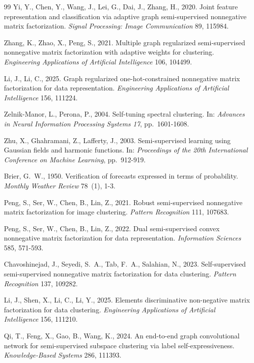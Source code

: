 \documentclass[11pt]{article}
\theoremstyle{remark}
\begin{document}
\begin{thebibliography}{99}
Yi, Y., Chen, Y., Wang, J., Lei, G., Dai, J., Zhang, H., 2020.
Joint feature representation and classification via adaptive graph semi-supervised nonnegative matrix factorization.
\emph{Signal Processing: Image Communication} 89, 115984.

Zhang, K., Zhao, X., Peng, S., 2021.
Multiple graph regularized semi-supervised nonnegative matrix factorization with adaptive weights for clustering.
\emph{Engineering Applications of Artificial Intelligence} 106, 104499.

Li, J., Li, C., 2025.
Graph regularized one-hot-constrained nonnegative matrix factorization for data representation.
\emph{Engineering Applications of Artificial Intelligence} 156, 111224.

Zelnik-Manor, L., Perona, P., 2004.
Self-tuning spectral clustering.
In: \emph{Advances in Neural Information Processing Systems 17}, pp.~1601-1608.

Zhu, X., Ghahramani, Z., Lafferty, J., 2003.
Semi-supervised learning using Gaussian fields and harmonic functions.
In: \emph{Proceedings of the 20th International Conference on Machine Learning}, pp.~912-919.

Brier, G.~W., 1950.
Verification of forecasts expressed in terms of probability.
\emph{Monthly Weather Review} 78~(1), 1-3.

Peng, S., Ser, W., Chen, B., Lin, Z., 2021.
Robust semi-supervised nonnegative matrix factorization for image clustering.
\emph{Pattern Recognition} 111, 107683.

Peng, S., Ser, W., Chen, B., Lin, Z., 2022.
Dual semi-supervised convex nonnegative matrix factorization for data representation.
\emph{Information Sciences} 585, 571-593.

Chavoshinejad, J., Seyedi, S.~A., Tab, F.~A., Salahian, N., 2023.
Self-supervised semi-supervised nonnegative matrix factorization for data clustering.
\emph{Pattern Recognition} 137, 109282.

Li, J., Shen, X., Li, C., Li, Y., 2025.
Elements discriminative non-negative matrix factorization for data clustering.
\emph{Engineering Applications of Artificial Intelligence} 156, 111210.

Qi, T., Feng, X., Gao, B., Wang, K., 2024.
An end-to-end graph convolutional network for semi-supervised subspace clustering via label self-expressiveness.
\emph{Knowledge-Based Systems} 286, 111393.


\end{thebibliography}
\end{document}
